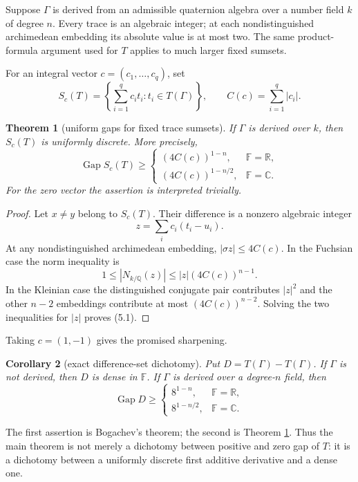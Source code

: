 \documentclass[11pt,reqno]{amsart}
\newtheorem{theorem}{Theorem}[section]
\newtheorem{corollary}[theorem]{Corollary}
\theoremstyle{definition}
\theoremstyle{remark}
\newcommand{\R}{\mathbb R}
\newcommand{\C}{\mathbb C}
\newcommand{\Q}{\mathbb Q}
\newcommand{\F}{\mathbb F}
\newcommand{\Gap}{\operatorname{Gap}}
\begin{document}
Suppose \(\Gamma\) is derived from an admissible quaternion algebra over a
number field \(k\) of degree \(n\).  Every trace is an algebraic integer; at
each nondistinguished archimedean embedding its absolute value is at most two.
The same product-formula argument used for \(T\) applies to much larger fixed
sumsets.

For an integral vector \(c=(c_1,\ldots,c_q)\), set
\[
 S_c(T)=\left\{\sum_{i=1}^q c_it_i:t_i\in T(\Gamma)\right\},
 \qquad C(c)=\sum_{i=1}^q|c_i|.
\]

\begin{theorem}[uniform gaps for fixed trace sumsets]\label{thm:sumset-gap}
If \(\Gamma\) is derived over \(k\), then \(S_c(T)\) is uniformly discrete.
More precisely,
\[
 \Gap S_c(T)\ge
 \begin{cases}
 (4C(c))^{1-n},&\F=\R,\\[2mm]
 (4C(c))^{1-n/2},&\F=\C.
 \end{cases}
\tag{5.1}
\]
For the zero vector the assertion is interpreted trivially.
\end{theorem}

\begin{proof}
Let \(x\ne y\) belong to \(S_c(T)\).  Their difference is a nonzero algebraic
integer
\[
 z=\sum_i c_i(t_i-u_i).
\]
At any nondistinguished archimedean embedding,
\(|\sigma z|\le4C(c)\).  In the Fuchsian case the norm inequality is
\[
 1\le |N_{k/\Q}(z)|
 \le |z|(4C(c))^{n-1}.
\]
In the Kleinian case the distinguished conjugate pair contributes \(|z|^2\)
and the other \(n-2\) embeddings contribute at most
\((4C(c))^{n-2}\).  Solving the two inequalities for \(|z|\) proves (5.1).
\end{proof}

Taking \(c=(1,-1)\) gives the promised sharpening.

\begin{corollary}[exact difference-set dichotomy]\label{cor:difference}
Put \(D=T(\Gamma)-T(\Gamma)\).  If \(\Gamma\) is not derived, then \(D\) is
dense in \(\F\).  If \(\Gamma\) is derived over a degree-\(n\) field, then
\[
 \Gap D\ge
 \begin{cases}
 8^{1-n},&\F=\R,\\[1mm]
 8^{1-n/2},&\F=\C.
 \end{cases}
\]
\end{corollary}

The first assertion is Bogachev's theorem; the second is Theorem
\ref{thm:sumset-gap}.  Thus the main theorem is not merely a dichotomy between
positive and zero gap of \(T\): it is a dichotomy between a uniformly discrete
first additive derivative and a dense one.
\end{document}
